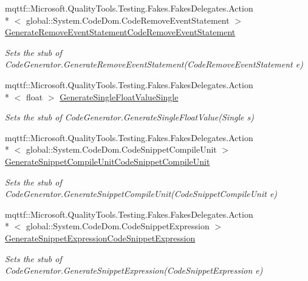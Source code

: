 \begin{DoxyCompactItemize}
mqttf\-::\-Microsoft.\-Quality\-Tools.\-Testing.\-Fakes.\-Fakes\-Delegates.\-Action\\*
$<$ global\-::\-System.\-Code\-Dom.\-Code\-Remove\-Event\-Statement $>$ \hyperlink{class_system_1_1_code_dom_1_1_compiler_1_1_fakes_1_1_stub_code_compiler_aa48c50f104c6aefe788ffcb4a4c627eb}{Generate\-Remove\-Event\-Statement\-Code\-Remove\-Event\-Statement}
\begin{DoxyCompactList}\small\item\em Sets the stub of Code\-Generator.\-Generate\-Remove\-Event\-Statement(\-Code\-Remove\-Event\-Statement e)\end{DoxyCompactList}\item 
mqttf\-::\-Microsoft.\-Quality\-Tools.\-Testing.\-Fakes.\-Fakes\-Delegates.\-Action\\*
$<$ float $>$ \hyperlink{class_system_1_1_code_dom_1_1_compiler_1_1_fakes_1_1_stub_code_compiler_aa9ff03e40d5a74175b4f7314b2f8f155}{Generate\-Single\-Float\-Value\-Single}
\begin{DoxyCompactList}\small\item\em Sets the stub of Code\-Generator.\-Generate\-Single\-Float\-Value(\-Single s)\end{DoxyCompactList}\item 
mqttf\-::\-Microsoft.\-Quality\-Tools.\-Testing.\-Fakes.\-Fakes\-Delegates.\-Action\\*
$<$ global\-::\-System.\-Code\-Dom.\-Code\-Snippet\-Compile\-Unit $>$ \hyperlink{class_system_1_1_code_dom_1_1_compiler_1_1_fakes_1_1_stub_code_compiler_a583f9d353244d6675f70b91e108dc5fd}{Generate\-Snippet\-Compile\-Unit\-Code\-Snippet\-Compile\-Unit}
\begin{DoxyCompactList}\small\item\em Sets the stub of Code\-Generator.\-Generate\-Snippet\-Compile\-Unit(\-Code\-Snippet\-Compile\-Unit e)\end{DoxyCompactList}\item 
mqttf\-::\-Microsoft.\-Quality\-Tools.\-Testing.\-Fakes.\-Fakes\-Delegates.\-Action\\*
$<$ global\-::\-System.\-Code\-Dom.\-Code\-Snippet\-Expression $>$ \hyperlink{class_system_1_1_code_dom_1_1_compiler_1_1_fakes_1_1_stub_code_compiler_abb6f82d50785cbc8034c6709ece150a7}{Generate\-Snippet\-Expression\-Code\-Snippet\-Expression}
\begin{DoxyCompactList}\small\item\em Sets the stub of Code\-Generator.\-Generate\-Snippet\-Expression(\-Code\-Snippet\-Expression e)\end{DoxyCompactList}\item 

\end{DoxyCompactItemize}
